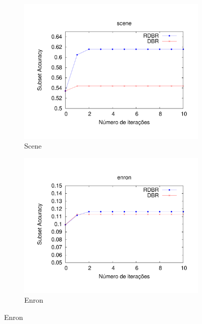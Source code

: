 \begin{figure}
\begin{subfigure}{.5\textwidth}
  \centering
  \includegraphics[angle=-90, width=1\linewidth]{plots/scene}
  \caption{Scene}
  \label{fig:subscene}
\end{subfigure}%
\begin{subfigure}{.5\textwidth}
  \centering
  \includegraphics[angle=-90, width=1\linewidth]{plots/enron}
  \caption{Enron}
  \label{fig:subenron}
\end{subfigure}


\end{figure}
